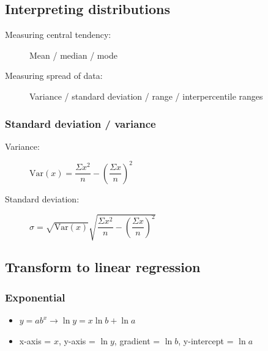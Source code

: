 \documentclass[A4paper, 11pt]{article}
\begin{document}
	\subsection{Interpreting distributions}
	\begin{description}
		\item[Measuring central tendency:] Mean / median / mode
		\item[Measuring spread of data:] Variance / standard deviation / range / interpercentile ranges
	
	\end{description}
	
	\subsubsection{Standard deviation / variance}
	\begin{description}
		\item[Variance:] $\mathrm{Var}(x)=\dfrac{\Sigma x^2}{n} - (\dfrac{\Sigma x}{n})^2$
		\item[Standard deviation:] $\sigma=\sqrt{\mathrm{Var}(x)}\sqrt{\dfrac{\Sigma x^2}{n} - (\dfrac{\Sigma x}{n})^2}$
	\end{description}
	

	
	\subsection{Transform to linear regression}
	\subsubsection{Exponential}
	\begin{itemize}
		\item $y=ab^x\rightarrow\ln y = x\ln b + \ln a$
		\item x-axis = $x$, y-axis = $\ln y$, gradient = $\ln b$, y-intercept = $\ln a$
	\end{itemize}
\end{document}
